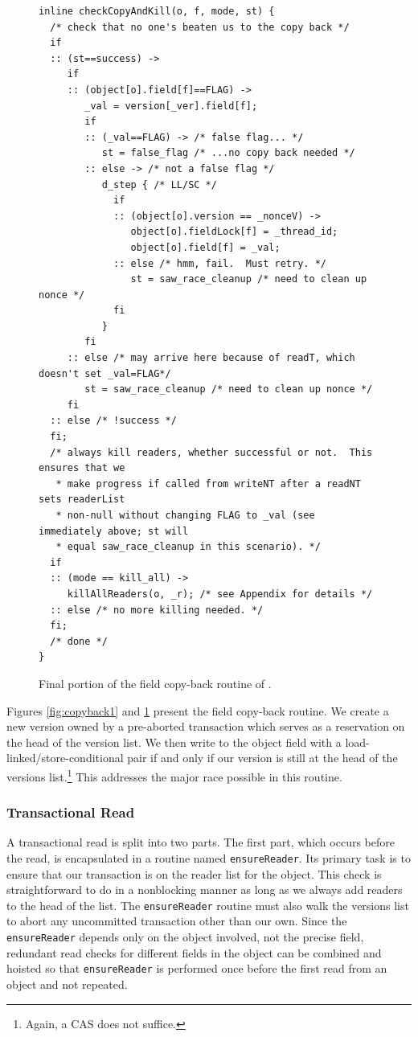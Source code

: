 \begin{figure}\sis\fontsize{9}{10}
\begin{verbatim}
inline checkCopyAndKill(o, f, mode, st) {
  /* check that no one's beaten us to the copy back */
  if
  :: (st==success) ->
     if
     :: (object[o].field[f]==FLAG) ->
        _val = version[_ver].field[f];
        if
        :: (_val==FLAG) -> /* false flag... */
           st = false_flag /* ...no copy back needed */
        :: else -> /* not a false flag */
           d_step { /* LL/SC */
             if
             :: (object[o].version == _nonceV) ->
                object[o].fieldLock[f] = _thread_id;
                object[o].field[f] = _val;
             :: else /* hmm, fail.  Must retry. */
                st = saw_race_cleanup /* need to clean up nonce */
             fi
           }
        fi
     :: else /* may arrive here because of readT, which doesn't set _val=FLAG*/
        st = saw_race_cleanup /* need to clean up nonce */
     fi
  :: else /* !success */
  fi;
  /* always kill readers, whether successful or not.  This ensures that we
   * make progress if called from writeNT after a readNT sets readerList
   * non-null without changing FLAG to _val (see immediately above; st will
   * equal saw_race_cleanup in this scenario). */
  if
  :: (mode == kill_all) ->
     killAllReaders(o, _r); /* see Appendix for details */
  :: else /* no more killing needed. */
  fi;
  /* done */
}
\end{verbatim}
\caption[Final portion of the field copy-back routine.]
 {Final portion of the field copy-back routine of .}
\label{fig:copyback2}
\end{figure}
Figures \ref{fig:copyback1} and \ref{fig:copyback2} present the field copy-back routine.  We create a
new version owned by a pre-aborted transaction which serves as a
reservation on the head of the version list.  We then write to the
object field with a load-linked/store-conditional pair if and only if
our version is still at the head of the versions list.\footnote{Again,
  a CAS does not suffice.}  This addresses
the major race possible in this routine.

\subsubsection{Transactional Read}\label{sec:readT}
A transactional read is split into two parts.  The first part, which
occurs before the read, is encapsulated in a routine named
\texttt{ensureReader}.  Its primary task is to
ensure that our transaction is on the reader list for the
object.  This check is straightforward to do in a nonblocking manner as
long as we always add readers to the head of the list.  The
\texttt{ensureReader} routine must also
walk the versions list to abort any uncommitted transaction other
than our own.  Since the \texttt{ensureReader} depends only on the
object involved, not the precise field, redundant read checks for
different fields in the object can be combined and hoisted so that 
\texttt{ensureReader} is performed
once before the first read from an object and not repeated.

